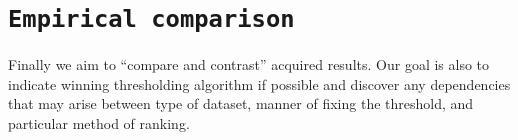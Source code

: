 \documentclass[12pt,a4paper,twocolumn]{article}
\begin{document}
\section*{\texttt{Empirical comparison}}
Finally we aim to ``compare and contrast'' acquired results. Our goal is also to indicate winning thresholding algorithm if possible and discover any dependencies that may arise between type of dataset, manner of fixing the threshold, and particular method of ranking.

\end{document}
